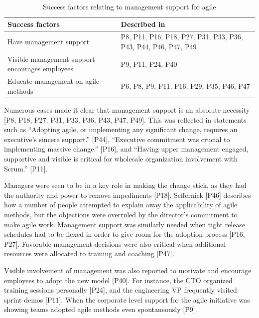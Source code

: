 \begin{table}[h]
    \centering
    \begin{tabular}{ >{\raggedright\arraybackslash}p{}
                     >{\raggedright\arraybackslash}p{} }
        \toprule
        Success factors  &  Described in \\
        \midrule
        Have management support  &
                P8, P11, P16, P18, P27, P31, P33, P36,
                P43, P44, P46, P47, P49  \\
        Visible management support encourages employees  &
                P9, P11, P24, P40  \\
        Educate management on agile methods  &
                P6, P8, P9, P11, P16, P29, P35, P46, P47  \\
        \bottomrule
    \end{tabular}
    \caption{Success factors relating to management support for agile}
    \label{table:success_management}
\end{table}


Numerous cases made it clear that management support is an absolute necessity
[P8, P18, P27, P31, P33, P36, P43, P47, P49].
This was reflected in statements such as ``Adopting agile, or implementing any
significant change, requires an executive’s sincere support.'' [P44],
``Executive commitment was crucial to implementing massive change.'' [P16], and
``Having upper management engaged, supportive and visible is critical for
wholesale organization involvement with Scrum.'' [P11].

Managers were seen to be in a key role in making the change stick, as they had
the authority and power to remove impediments [P18]. Seffernick [P46] describes
how a number of people attempted to explain away the applicability of agile
methods, but the objections were overruled by the director's commitment to make
agile work. Management support was similarly needed when tight release schedules
had to be flexed in order to give room for the adoption process [P16, P27].
Favorable management decisions were also critical when additional resources were
allocated to training and coaching [P47].

Visible involvement of management was also reported to motivate and encourage
employees to adopt the new model [P40]. For instance, the CTO organized training
sessions personally [P24], and the engineering VP frequently visited sprint
demos [P11]. When the corporate level support for the agile initiative was
showing teams adopted agile methods even spontaneously [P9].

